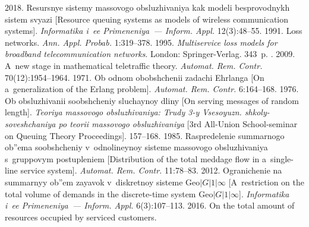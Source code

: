 
  \begin{multicols}{2}

\renewcommand{\bibname}{\protect\rmfamily References}

{\small\frenchspacing
 {%
 \begin{thebibliography}{99}
2018. Resursnye sistemy massovogo obsluzhivaniya kak modeli besprovodnykh 
sistem svyazi [Resource queuing systems as models of wireless communication systems]. 
\textit{Informatika i~ee Primeneniya~--- Inform. Appl.} 12(3):48--55.
  1991. Loss networks.
\textit{Ann. Appl. Probab.} 1:319--378.
 1995. \textit{Multiservice loss models for broadband telecommunication 
networks}. London: Springer-Verlag. 343~p.
. 2009. 
A~new stage in mathematical teletraffic theory. 
\textit{Automat. Rem. Contr.} 70(12):1954--1964.
 1971. Ob odnom obobshchenii zadachi Ehrlanga 
[On a~generalization of the Erlang problem]. 
\textit{Automat. Rem. Contr.} 6:164--168.
 1976. Ob obsluzhivanii soobshcheniy sluchaynoy dliny 
[On serving messages of random length]. 
\textit{Teoriya massovogo obsluzhivaniya: Trudy 3-y Vsesoyuzn. shkoly-soveshchaniya 
po teorii massovogo obsluzhivaniya} 
[3rd All-Union School-seminar on Queuing Theory Proceedings]. 157--168.
 1985. Raspredelenie summarnogo ob''ema soobshcheniy 
v~odnolineynoy sisteme massovogo obsluzhivaniya s~gruppovym postupleniem 
[Distribution of the total meddage flow in a~single-line service system]. 
\textit{Automat. Rem. Contr.} 11:78--83.
2012. Ogranichenie na summarnyy ob''em zayavok v~diskretnoy sisteme $\mathrm{Geo}|G|1|\infty$ 
[A~restriction on the total volume of demands in the discrete-time system 
$\mathrm{Geo}|G|1|\infty$]. \textit{Informatika i~ee Primeneniya~--- Inform. Appl.} 6(3):107--113.
2016. On the total amount of resources occupied by serviced customers. 

\end{thebibliography}}}
\end{multicols}
